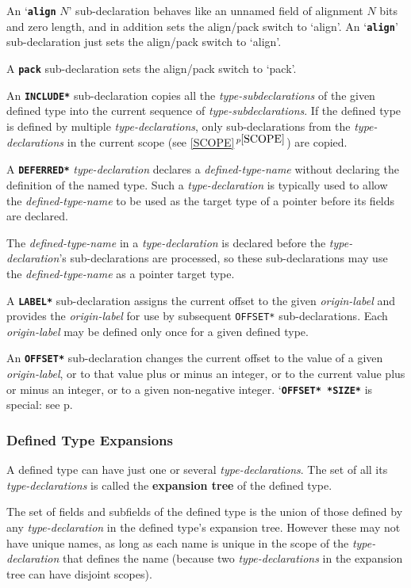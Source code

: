 \documentclass[12pt]{article}
\newcommand{\key}[1]{{\rm \bfseries #1}}
\newcommand{\ttkey}[1]{{\tt \bfseries #1}}
\newcommand{\itemref}[1]{\ref{#1}$\,^{p\pageref{#1}}$}
\newcommand{\pagref}[1]{p\pageref{#1}}
\begin{document}
An `\ttkey{align} $N$' sub-declaration behaves like an unnamed
field of alignment $N$ bits and zero length,
and in addition sets the align/pack switch to `align'.
An `\ttkey{align}' sub-declaration just sets the
align/pack switch to `align'.

A \ttkey{pack} sub-declaration sets the align/pack switch to `pack'.

An \ttkey{*INCLUDE*} sub-declaration copies all the {\em type-subdeclarations}
of the given defined type into the current sequence of
{\em type-subdeclarations}.
If the defined type is
defined by multiple {\em type-declarations}, only sub-declarations
from the {\em type-declarations} in the current scope (see \itemref{SCOPE})
are copied.

A \ttkey{*DEFERRED*} {\em type-declaration} declares a {\em defined-type-name}
without declaring the definition of the named type.
Such a {\em type-declaration} is typically used to allow the
{\em defined-type-name}
to be used as the target type of a pointer before its fields are declared.

The {\em defined-type-name} in a {\em type-declaration} is declared before
the {\em type-declaration}'s sub-declarations are processed, so these
sub-declarations may use the {\em defined-type-name} as a pointer target type.

A \ttkey{*LABEL*} sub-declaration assigns the current offset to the
given {\em origin-label} and provides the {\em origin-label}
for use by subsequent {\tt *OFFSET*} sub-declarations.
Each {\em origin-label} may be defined only once for a given
defined type.

An \ttkey{*OFFSET*} sub-declaration changes the current offset to the value
of a given {\em origin-label}, or to that value plus or minus
an integer, or to the current value plus or minus an integer,
or to a given non-negative integer.
`\ttkey{*OFFSET* *SIZE*} is special: see \pagref{OFFSET-SIZE}.

\subsubsection{Defined Type Expansions }
\label{DEFINED-TYPE-EXPANSIONS}

A defined type can have just one or several {\em type-declara\-tions}.
The set of all its {\em type-declarations} is called the
\key{expansion tree} of the defined type.

The set of fields and subfields of the
defined type is
the union of those defined by any {\em type-declaration} in the defined
type's expansion tree.  However these may not have unique names, as long
as each name is unique in the scope of the {\em type-declaration}
that defines the name (because two {\em type-declarations} in the expansion
tree can have disjoint scopes).
\end{document}
